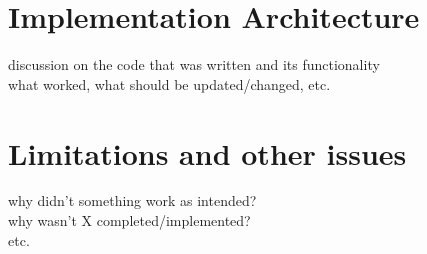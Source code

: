 \section{Implementation Architecture}
\label{sec:implemented_architecture}
discussion on the code that was written and its functionality \\
what worked, what should be updated/changed, etc.

\section{Limitations and other issues}
\label{sec:limitations_and_issues}
why didn't something work as intended? \\
why wasn't X completed/implemented? \\
etc.
